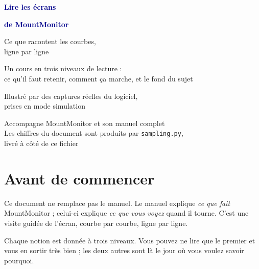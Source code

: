 \documentclass[a4paper,11pt,twoside]{report}
\begin{document}
\begin{titlepage}
\centering
\vspace*{3cm}
{\Huge\bfseries\textcolor{darkblue}{Lire les écrans}\par}
\vspace{0.4cm}
{\Huge\bfseries\textcolor{darkblue}{de MountMonitor}\par}
\vspace{1.2cm}
{\LARGE\textcolor{accentblue}{Ce que racontent les courbes,\\ligne par ligne}\par}
\vspace{2cm}
{\large\textcolor{midgray}{Un cours en trois niveaux de lecture :\\
ce qu'il faut retenir, comment ça marche, et le fond du sujet}\par}
\vspace{3cm}
{\normalsize Illustré par des captures réelles du logiciel,\\
prises en mode simulation\par}
\vspace{1cm}
{\small\textcolor{midgray}{\begin{minipage}{0.8\textwidth}\centering
Accompagne MountMonitor et son manuel complet\\
Les chiffres du document sont produits par \texttt{sampling.py},\\
livré à côté de ce fichier
\end{minipage}}}
\end{titlepage}

\tableofcontents
\newpage

\chapter*{Avant de commencer}

Ce document ne remplace pas le manuel. Le manuel explique \emph{ce que fait}
MountMonitor ; celui-ci explique \emph{ce que vous voyez} quand il tourne.
C'est une visite guidée de l'écran, courbe par courbe, ligne par ligne.

\vspace{0.4cm}
Chaque notion est donnée à trois niveaux. Vous pouvez ne lire que le premier
et vous en sortir très bien ; les deux autres sont là le jour où vous voulez
savoir pourquoi.
\end{document}
